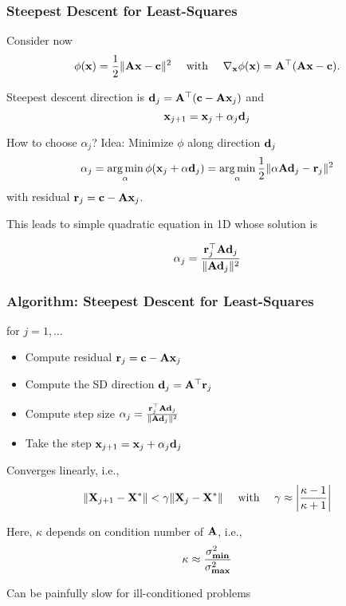 \documentclass[12pt,fleqn]{beamer}
\begin{document}


\begin{frame}\frametitle{Steepest Descent for Least-Squares}

Consider now
$$ \phi({\bf x}) = {\frac 12} \|{\bf A} {\bf x} - {\bf c}\|^2 \quad \text{ with } \quad \nabla_{{\bf x}} \phi({\bf x}) = {\bf A}^{\top}({\bf A} {\bf x} -  {\bf c}).$$

\bigskip

Steepest descent direction is  ${\bf d}_j = {\bf A}^{\top}({\bf c} - {\bf A} {\bf x}_j)$ and
$$ {\bf x}_{j+1} = {\bf x}_j + \alpha_j {\bf d}_j $$

How to choose $\alpha_j$? 
\pause
Idea: Minimize $\phi$ along direction ${\bf d}_j$
$$ 
\alpha_j = \operatorname*{arg\,min}_\alpha \phi({\bf x}_j + \alpha {\bf d}_j) = 
 \operatorname*{arg\,min}_\alpha {\frac 12} \|\alpha {\bf A} {\bf d}_j - {\bf r}_j\|^2
$$
with residual ${\bf r}_j = {\bf c} - {\bf A} {\bf x}_j $.

\bigskip
\pause

This leads to simple quadratic equation in 1D whose solution is
 
  
$$ \alpha_j = {\frac { {\bf r}_j^{\top}{\bf A}{\bf d}_j}{\|{\bf A} {\bf d}_j\|^2}} $$


\end{frame}


\begin{frame}\frametitle{Algorithm: Steepest Descent for Least-Squares}


for $j=1,\ldots $
\begin{itemize}
\item Compute residual ${\bf r}_j = {\bf c} - {\bf A} {\bf x}_j$
\item Compute the SD direction ${\bf d}_j = {\bf A}^{\top}{\bf r}_j$
\item Compute step size  $\alpha_j = {\frac { {\bf r}_j^{\top}{\bf A}{\bf d}_j }{\|{\bf A} {\bf d}_j\|^2}}$
\item Take the step ${\bf x}_{j+1} = {\bf x}_j + \alpha_j {\bf d}_j$
\end{itemize}

\pause

Converges linearly, i.e., 
$$
	\| {\bf X}_{j+1} - {\bf X}^*\| < \gamma \|{\bf X}_j - {\bf X}^* \| \quad \text{ with } \quad \gamma \approx \left| {\frac {\kappa-1}{\kappa+1}} \right|
$$

Here, $\kappa$ depends on condition number of ${\bf A}$, i.e., 
$$ \kappa \approx {\frac {\sigma_{\bf min}^2}{\sigma_{\bf max}^2}} $$


Can be painfully slow for ill-conditioned problems

\end{frame}
\end{document}
